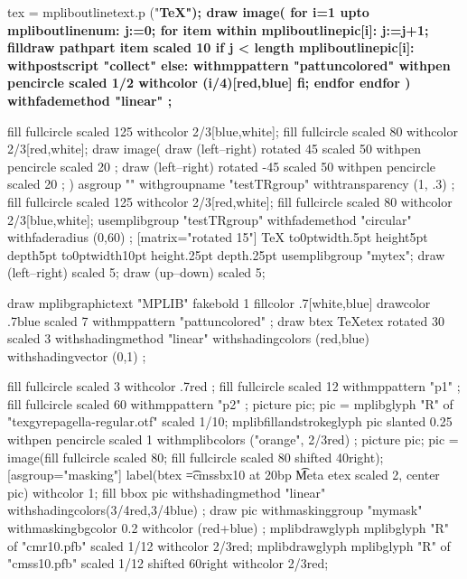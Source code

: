  tex = mpliboutlinetext.p ("\bf \TeX");
  draw image(
  for i=1 upto mpliboutlinenum:
    j:=0;
    for item within mpliboutlinepic[i]:
      j:=j+1;
      filldraw pathpart item scaled 10
      if j < length mpliboutlinepic[i]:
          withpostscript "collect"
      else:
          withmppattern "pattuncolored"
          withpen pencircle scaled 1/2
          withcolor (i/4)[red,blue]
      fi;
    endfor
  endfor
  )
  withfademethod "linear"
  ;
\endmpfig
\par\leavevmode
\mpfig
fill fullcircle scaled 125 withcolor 2/3[blue,white];
fill fullcircle scaled 80  withcolor 2/3[red,white];
draw image(
  draw (left--right) rotated 45 scaled 50
    withpen pencircle scaled 20
    ;
  draw (left--right) rotated -45 scaled 50
    withpen pencircle scaled 20
    ;
  )
  asgroup ""
  withgroupname "testTRgroup"
  withtransparency (1, .3)
  ;
\endmpfig
\mpfig
fill fullcircle scaled 125 withcolor 2/3[red,white];
fill fullcircle scaled 80  withcolor 2/3[blue,white];
usemplibgroup "testTRgroup"
  withfademethod "circular"
  withfaderadius (0,60)
  ;
\endmpfig
{}[matrix="rotated 15"] \TeX \endmplibgroup
\hbox to0pt{\hss\vrule width.5pt height5pt depth5pt\hss}%
\hbox to0pt{\hss\vrule width10pt height.25pt depth.25pt\hss}%
%
\mpfig[externalizemargin=5bp] usemplibgroup "mytex"; draw (left--right) scaled 5; draw (up--down) scaled 5; \endmpfig
\par
\leavevmode
\mpfig
  draw mplibgraphictext "\myfont MPLIB"
  fakebold 1 fillcolor .7[white,blue] drawcolor .7blue scaled 7
  withmppattern "pattuncolored" ;
\endmpfig
\mpfig
  draw btex \myfont\TeX etex rotated 30 scaled 3
    withshadingmethod "linear"
    withshadingcolors (red,blue)
    withshadingvector (0,1)
    ;
\endmpfig

\leavevmode
{}
  \mpfig
    fill fullcircle scaled 3
    withcolor .7red
    ;
  \endmpfig
\endmppattern
{}
  \mpfig
    fill fullcircle scaled 12
    withmppattern "p1"
    ;
  \endmpfig
\endmppattern
\mpfig
  fill fullcircle scaled 60
  withmppattern "p2"
  ;
\endmpfig
\mpfig
picture pic;
pic = mplibglyph "R" of "texgyrepagella-regular.otf" scaled 1/10;
mplibfillandstrokeglyph pic
  slanted 0.25
  withpen pencircle scaled 1
  withmplibcolors ("orange", 2/3red)
  ;
\endmpfig
\mpfig*
  picture pic;
  pic = image(fill fullcircle scaled 80; fill fullcircle scaled 80 shifted 40right);
\endmpfig
{}[asgroup="masking"]
  \mpfig
    label(btex \font\t=cmssbx10 at 20bp \t Meta etex scaled 2, center pic) withcolor 1;
  \endmpfig
\endmplibgroup
\mpfig
  fill bbox pic
    withshadingmethod "linear"
    withshadingcolors(3/4red,3/4blue)
    ;
  draw pic
    withmaskinggroup "mymask"
    withmaskingbgcolor 0.2
    withcolor (red+blue)
    ;
\endmpfig
\mpfig
  mplibdrawglyph mplibglyph "R" of "cmr10.pfb" scaled 1/12 withcolor 2/3red;
  mplibdrawglyph mplibglyph "R" of "cmss10.pfb" scaled 1/12 shifted 60right withcolor 2/3red;
\endmpfig
{}

